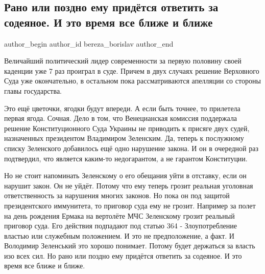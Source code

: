  
 
 
 
 
 
\subsection{Рано или поздно ему придётся ответить за содеяное. И это время все ближе и ближе}
\label{sec:14_12_2021.fb.bereza_borislav.1.zelenskii_sodejannoje}
 
\ifcmt
 author_begin
   author_id bereza_borislav
 author_end
\fi

Величайший политический лидер современности за первую половину своей каденции
уже 7 раз проиграл в суде. Причем в двух случаях решение Верховного Суда уже
окончательно, в остальном пока рассматриваются апелляции со стороны главы
государства. 


Это ещё цветочки, ягодки будут впереди. А если быть точнее, то прилетела первая
ягода. Сочная. Дело в том, что Венецианская комиссия поддержала решение
Конституционного Суда Украины не приводить к присяге двух судей, назначенных
президентом Владимиром Зеленским. Да, теперь к послужному списку Зеленского
добавилось ещё одно нарушение закона. И он в очередной раз подтвердил, что
является каким-то недогарантом, а не гарантом Конституции.

Но не стоит напоминать Зеленскому о его обещания уйти в отставку, если он
нарушит закон. Он не уйдёт. Потому что ему теперь грозит реальная уголовная
ответственность за нарушения многих законов. Но пока он под защитой
президентского иммунитета, то приговор суда ему не грозит. Например за полет на
день рождения Ермака на вертолёте МЧС Зеленскому грозит реальный приговор суда.
Его действия подпадают под статью 364 - Злоупотребление властью или служебным
положением. И это не предположение, а факт. И Володимир Зеленський это хорошо
понимает. Потому будет держаться за власть изо всех сил. Но рано или поздно ему
придётся ответить за содеяное. И это время все ближе и ближе.
